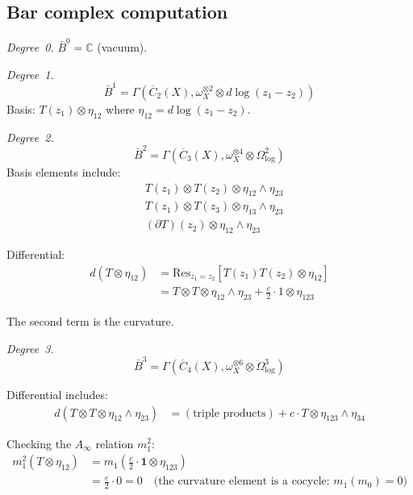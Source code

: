 \subsection{Bar complex computation}

\begin{computation}
\emph{Degree~0.} $\bar{B}^0 = \mathbb{C}$ (vacuum).

\emph{Degree~1.}
\begin{equation}
\bar{B}^1 = \Gamma(\overline{C}_2(X), \omega_X^{\otimes 2} \otimes d\log(z_1-z_2))
\end{equation}
Basis: $T(z_1) \otimes \eta_{12}$ where $\eta_{12} = d\log(z_1-z_2)$.

\emph{Degree~2.}
\begin{equation}
\bar{B}^2 = \Gamma(\overline{C}_3(X), \omega_X^{\otimes 4} \otimes \Omega^2_{\log})
\end{equation}
Basis elements include:
\begin{align}
&T(z_1) \otimes T(z_2) \otimes \eta_{12} \wedge \eta_{23} \\
&T(z_1) \otimes T(z_3) \otimes \eta_{13} \wedge \eta_{23} \\
&(\partial T)(z_2) \otimes \eta_{12} \wedge \eta_{23}
\end{align}

Differential:
\begin{align}
d(T \otimes \eta_{12}) &= \mathrm{Res}_{z_1=z_2}[T(z_1)T(z_2) \otimes \eta_{12}] \\
&= T \otimes T \otimes \eta_{12} \wedge \eta_{23} + \frac{c}{2} \cdot 1 \otimes \eta_{123}
\end{align}

The second term is the curvature.

\emph{Degree~3.}
\begin{equation}
\bar{B}^3 = \Gamma(\overline{C}_4(X), \omega_X^{\otimes 6} \otimes \Omega^3_{\log})
\end{equation}

Differential includes:
\begin{align}
d(T \otimes T \otimes \eta_{12} \wedge \eta_{23}) &= (\text{triple products}) + c \cdot T \otimes \eta_{123} \wedge \eta_{34}
\end{align}

Checking the $A_\infty$ relation $m_1^2$:
\begin{align}
m_1^2(T \otimes \eta_{12}) &= m_1\!\left(\frac{c}{2} \cdot \mathbf{1} \otimes \eta_{123}\right) \\
&= \frac{c}{2} \cdot 0 = 0 \quad \text{(the curvature element is a cocycle: } m_1(m_0) = 0\text{)}
\end{align}


\end{computation}
